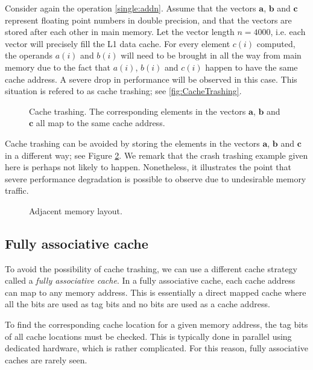 Consider again the operation \eqref{single:addn}. Assume that the vectors $\bm
a$, $\bm b$ and $\bm c$ represent floating point numbers in double precision,
and that the vectors are stored after each other in main memory. Let the vector
length $n=4000$, i.e. each vector will precisely fill the L1 data cache. For
every element $c(i)$ computed, the operands $a(i)$ and $b(i)$ will need to be
brought in all the way from main memory due to the fact that $a(i)$, $b(i)$ and
$c(i)$ happen to have the same cache address. A severe drop in performance will
be observed in this case. This situation is refered to as cache trashing; see
\autoref{fig:CacheTrashing}.

\begin{figure}
  \centering
  
  \caption{
    Cache trashing. The corresponding elements in the vectors $\bm a$, $\bm b$
    and $\bm c$ all map to the same cache address.
  }
  \label{fig:CacheTrashing}
\end{figure}

Cache trashing can be avoided by storing the elements in the vectors $\bm a$,
$\bm b$ and $\bm c$ in a different way; see Figure \ref{fig:AdjacentMemory}. We
remark that the crash trashing example given here is perhaps not likely to
happen. Nonetheless, it illustrates the point that severe performance
degradation is possible to observe due to undesirable memory traffic.

\begin{figure}
  \centering
  
  \caption{Adjacent memory layout.}
  \label{fig:AdjacentMemory}
\end{figure}

\subsection{Fully associative cache}

To avoid the possibility of cache trashing, we can use a different cache
strategy called a \emph{fully associative cache}. In a fully associative cache,
each cache address can map to any memory address. This is essentially a direct
mapped cache where all the bits are used as tag bits and no bits are used as a
cache address.

To find the corresponding cache location for a given memory address, the tag
bits of all cache locations must be checked. This is typically done in parallel
using dedicated hardware, which is rather complicated. For this reason, fully
associative caches are rarely seen.

